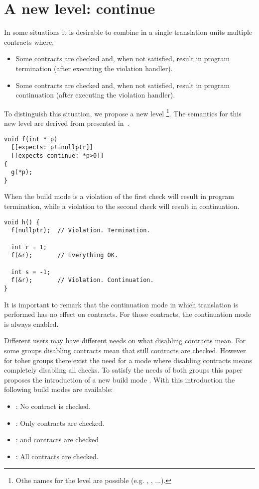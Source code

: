 \section{A new level: continue}
\label{sec:continue}

In some situations it is desirable to combine in a single translation units
multiple contracts where:
\begin{itemize}
	\item Some contracts are checked and, when not satisfied, result in
		program termination (after executing the violation handler).
	\item Some contracts are checked and, when not satisfied, result in
		program continuation (after executing the violation handler).
\end{itemize}

To distinguish this situation, we propose a new level
\footnote{Othe names for the level are possible (e.g.
, , ...).}.
The semantics for this new level are derived from
 presented in~\cite{p1332r0}.

\begin{lstlisting}
void f(int * p)
  [[expects: p!=nullptr]]
  [[expects continue: *p>0]]
{
  g(*p);
}
\end{lstlisting}

When the build mode is  a violation of the first check will
result in program termination, while a violation to the second check will result
in continuation.

\begin{lstlisting}
void h() {
  f(nullptr);  // Violation. Termination.

  int r = 1;
  f(&r);       // Everything OK.

  int s = -1;
  f(&r);       // Violation. Continuation.
}
\end{lstlisting}

It is important to remark that the continuation mode in which translation is
performed has no effect on  contracts. For those contracts, the
continuation mode is always enabled.

Different users may have different needs on what disabling contracts mean. For
some groups disabling contracts mean that still  contracts are
checked. However for toher groups there exist the need for a mode where
disabling contracts means completely disabling all checks. To satisfy the needs
of both groups this paper proposes the introduction of a new build mode
. With this introduction the following build modes are available:

\begin{itemize}

	\item {}: No contract is checked.

	\item {}: Only  contracts are checked.

	\item {}:  and  contracts
		are checked

	\item {}: All contracts are checked.

\end{itemize}
